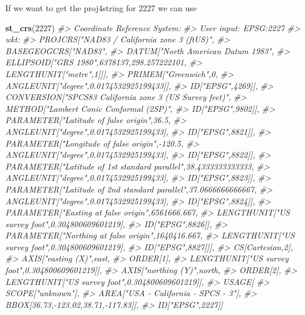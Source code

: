 \documentclass[
  12pt,
]{book}
\newenvironment{Shaded}{\begin{snugshade}}{\end{snugshade}}
\newcommand{\CommentTok}[1]{\textcolor[rgb]{0.37,0.37,0.37}{\textit{#1}}}
\newcommand{\DecValTok}[1]{\textcolor[rgb]{0.06,0.06,0.06}{#1}}
\newcommand{\KeywordTok}[1]{\textcolor[rgb]{0.27,0.27,0.27}{\textbf{#1}}}
\newcommand{\NormalTok}[1]{#1}
\begin{document}
If we want to get the proj4string for 2227 we can use

\begin{Shaded}
\begin{Highlighting}[]
\KeywordTok{st\_crs}\NormalTok{(}\DecValTok{2227}\NormalTok{)}
\CommentTok{\#> Coordinate Reference System:}
\CommentTok{\#>   User input: EPSG:2227 }
\CommentTok{\#>   wkt:}
\CommentTok{\#> PROJCRS["NAD83 / California zone 3 (ftUS)",}
\CommentTok{\#>     BASEGEOGCRS["NAD83",}
\CommentTok{\#>         DATUM["North American Datum 1983",}
\CommentTok{\#>             ELLIPSOID["GRS 1980",6378137,298.257222101,}
\CommentTok{\#>                 LENGTHUNIT["metre",1]]],}
\CommentTok{\#>         PRIMEM["Greenwich",0,}
\CommentTok{\#>             ANGLEUNIT["degree",0.0174532925199433]],}
\CommentTok{\#>         ID["EPSG",4269]],}
\CommentTok{\#>     CONVERSION["SPCS83 California zone 3 (US Survey feet)",}
\CommentTok{\#>         METHOD["Lambert Conic Conformal (2SP)",}
\CommentTok{\#>             ID["EPSG",9802]],}
\CommentTok{\#>         PARAMETER["Latitude of false origin",36.5,}
\CommentTok{\#>             ANGLEUNIT["degree",0.0174532925199433],}
\CommentTok{\#>             ID["EPSG",8821]],}
\CommentTok{\#>         PARAMETER["Longitude of false origin",{-}120.5,}
\CommentTok{\#>             ANGLEUNIT["degree",0.0174532925199433],}
\CommentTok{\#>             ID["EPSG",8822]],}
\CommentTok{\#>         PARAMETER["Latitude of 1st standard parallel",38.4333333333333,}
\CommentTok{\#>             ANGLEUNIT["degree",0.0174532925199433],}
\CommentTok{\#>             ID["EPSG",8823]],}
\CommentTok{\#>         PARAMETER["Latitude of 2nd standard parallel",37.0666666666667,}
\CommentTok{\#>             ANGLEUNIT["degree",0.0174532925199433],}
\CommentTok{\#>             ID["EPSG",8824]],}
\CommentTok{\#>         PARAMETER["Easting at false origin",6561666.667,}
\CommentTok{\#>             LENGTHUNIT["US survey foot",0.304800609601219],}
\CommentTok{\#>             ID["EPSG",8826]],}
\CommentTok{\#>         PARAMETER["Northing at false origin",1640416.667,}
\CommentTok{\#>             LENGTHUNIT["US survey foot",0.304800609601219],}
\CommentTok{\#>             ID["EPSG",8827]]],}
\CommentTok{\#>     CS[Cartesian,2],}
\CommentTok{\#>         AXIS["easting (X)",east,}
\CommentTok{\#>             ORDER[1],}
\CommentTok{\#>             LENGTHUNIT["US survey foot",0.304800609601219]],}
\CommentTok{\#>         AXIS["northing (Y)",north,}
\CommentTok{\#>             ORDER[2],}
\CommentTok{\#>             LENGTHUNIT["US survey foot",0.304800609601219]],}
\CommentTok{\#>     USAGE[}
\CommentTok{\#>         SCOPE["unknown"],}
\CommentTok{\#>         AREA["USA {-} California {-} SPCS {-} 3"],}
\CommentTok{\#>         BBOX[36.73,{-}123.02,38.71,{-}117.83]],}
\CommentTok{\#>     ID["EPSG",2227]]}
\end{Highlighting}
\end{Shaded}
\end{document}
